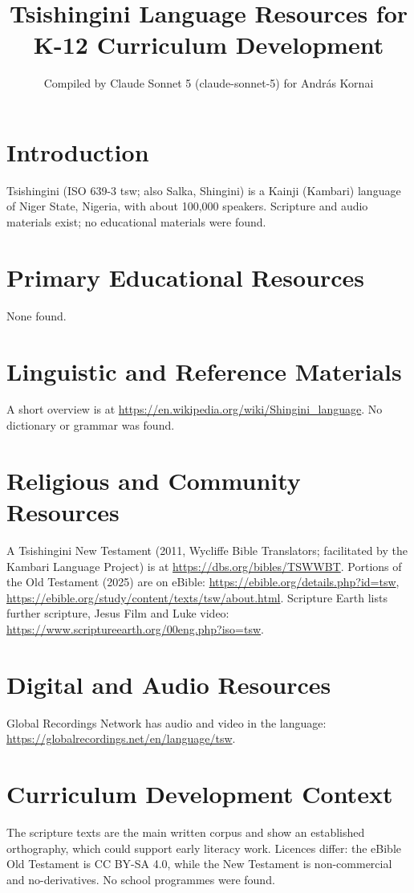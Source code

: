 \documentclass[12pt]{article}
\title{Tsishingini Language Resources for K-12 Curriculum Development}
\author{Compiled by Claude Sonnet 5 (claude-sonnet-5) for Andr\'as Kornai}
\date{}
\begin{document}
\maketitle
\section{Introduction}
Tsishingini (ISO 639-3 tsw; also Salka, Shingini) is a Kainji (Kambari) language of Niger State, Nigeria, with about 100,000 speakers. Scripture and audio materials exist; no educational materials were found.
\section{Primary Educational Resources}
None found.
\section{Linguistic and Reference Materials}
A short overview is at \url{https://en.wikipedia.org/wiki/Shingini_language}. No dictionary or grammar was found.
\section{Religious and Community Resources}
A Tsishingini New Testament (2011, Wycliffe Bible Translators; facilitated by the Kambari Language Project) is at \url{https://dbs.org/bibles/TSWWBT}. Portions of the Old Testament (2025) are on eBible: \url{https://ebible.org/details.php?id=tsw}, \url{https://ebible.org/study/content/texts/tsw/about.html}. Scripture Earth lists further scripture, Jesus Film and Luke video: \url{https://www.scriptureearth.org/00eng.php?iso=tsw}.
\section{Digital and Audio Resources}
Global Recordings Network has audio and video in the language: \url{https://globalrecordings.net/en/language/tsw}.
\section{Curriculum Development Context}
The scripture texts are the main written corpus and show an established orthography, which could support early literacy work. Licences differ: the eBible Old Testament is CC BY-SA 4.0, while the New Testament is non-commercial and no-derivatives. No school programmes were found.
\end{document}
